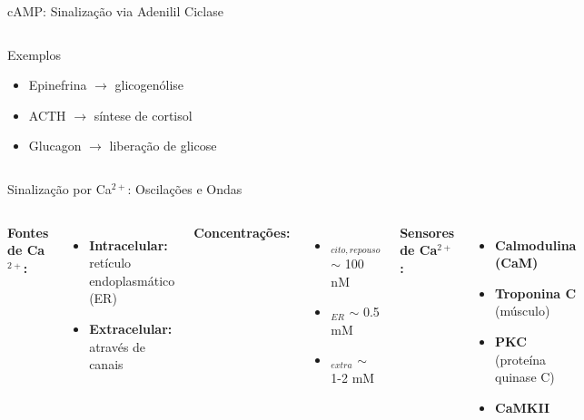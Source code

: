 \begin{frame}{cAMP: Sinalização via Adenilil Ciclase}
\begin{columns}
\begin{exampleblock}{Exemplos}
\begin{itemize}
    \item Epinefrina $\rightarrow$ glicogenólise
    \item ACTH $\rightarrow$ síntese de cortisol
    \item Glucagon $\rightarrow$ liberação de glicose
\end{itemize}
\end{exampleblock}
\end{columns}
\end{frame}

\begin{frame}{Sinalização por Ca$^{2+}$: Oscilações e Ondas}
\begin{columns}
\textbf{Fontes de Ca$^{2+}$:}
\begin{itemize}
    \item \textbf{Intracelular:} retículo endoplasmático (ER)
    \item \textbf{Extracelular:} através de canais
\end{itemize}

\vspace{0.3cm}

\textbf{Concentrações:}
\begin{itemize}
    \item [Ca$^{2+}$]$_{cito,repouso}$ $\sim$ 100 nM
    \item [Ca$^{2+}$]$_{ER}$ $\sim$ 0.5 mM
    \item [Ca$^{2+}$]$_{extra}$ $\sim$ 1-2 mM
\end{itemize}

\vspace{0.3cm}

\textbf{Sensores de Ca$^{2+}$:}
\begin{itemize}
    \item \textbf{Calmodulina (CaM)}
    \item \textbf{Troponina C} (músculo)
    \item \textbf{PKC} (proteína quinase C)
    \item \textbf{CaMKII}
\end{itemize}

\begin{center}
\end{center}
\end{columns}
\end{frame}
